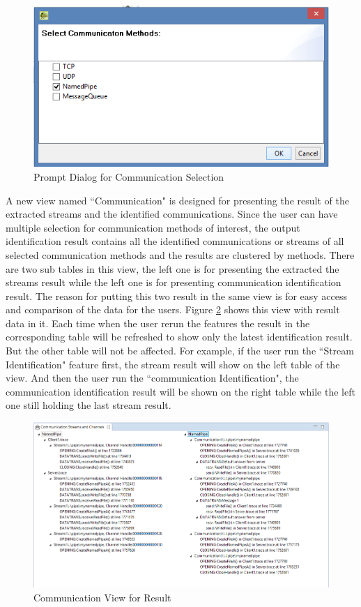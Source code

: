 \begin{figure}[H]
\centerline{\includegraphics[scale=0.8]{Figures/methods}}
 \caption{Prompt Dialog for Communication Selection}
\label{methods}
\end{figure}

A new view named ``Communication" is designed for presenting the result of the extracted streams and the identified communications. Since the user can have multiple selection for communication methods of interest, the output identification result contains all the identified communications or streams of all selected communication methods and the results are clustered by methods. There are two sub tables in this view, the left one is for presenting the extracted the streams result while the left one is for presenting communication identification result. The reason for putting this two result in the same view is for easy access and comparison of the data for the users. Figure \ref{idenview} shows this view with result data in it. Each time when the user rerun the features the result in the corresponding table will be refreshed to show only the latest identification result. But the other table will not be affected. For example, if the user run the ``Stream Identification" feature first, the stream result will show on the left table of the view. And then the user run the ``communication Identification", the communication identification result will be shown on the right table while the left one still holding the last stream result.

\begin{figure}[H]
\centerline{\includegraphics[scale=0.7]{Figures/idenview}}
 \caption{Communication View for Result}
\label{idenview}
\end{figure}


